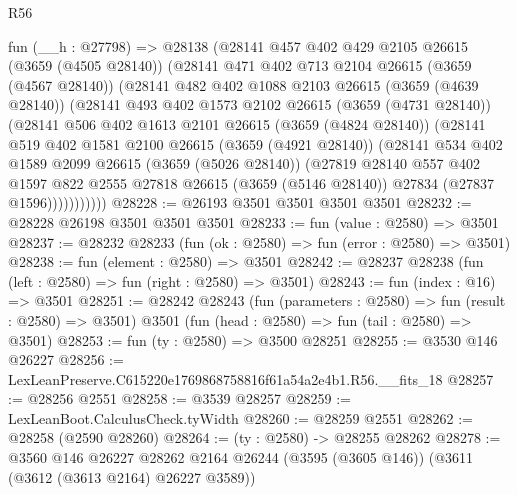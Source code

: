 \begin{lexlean}{R56}
\begin{coremodule}
      fun (__h : @27798) =>
      @28138
        (@28141
          @457
          @402
          @429
          @2105
          @26615
          (@3659 (@4505 @28140))
          (@28141
            @471
            @402
            @713
            @2104
            @26615
            (@3659 (@4567 @28140))
            (@28141
              @482
              @402
              @1088
              @2103
              @26615
              (@3659 (@4639 @28140))
              (@28141
                @493
                @402
                @1573
                @2102
                @26615
                (@3659 (@4731 @28140))
                (@28141
                  @506
                  @402
                  @1613
                  @2101
                  @26615
                  (@3659 (@4824 @28140))
                  (@28141
                    @519
                    @402
                    @1581
                    @2100
                    @26615
                    (@3659 (@4921 @28140))
                    (@28141
                      @534
                      @402
                      @1589
                      @2099
                      @26615
                      (@3659 (@5026 @28140))
                      (@27819
                        @28140
                        @557
                        @402
                        @1597
                        @822
                        @2555
                        @27818
                        @26615
                        (@3659 (@5146 @28140))
                        @27834
                        (@27837 @1596)))))))))))
@28228 := @26193 @3501 @3501 @3501 @3501
@28232 := @28228 @26198 @3501 @3501 @3501
@28233 := fun (value : @2580) => @3501
@28237 := @28232 @28233 (fun (ok : @2580) => fun (error : @2580) => @3501)
@28238 := fun (element : @2580) => @3501
@28242 := @28237 @28238 (fun (left : @2580) => fun (right : @2580) => @3501)
@28243 := fun (index : @16) => @3501
@28251 := @28242
    @28243
    (fun (parameters : @2580) => fun (result : @2580) => @3501)
    @3501
    (fun (head : @2580) => fun (tail : @2580) => @3501)
@28253 := fun (ty : @2580) => @3500 @28251
@28255 := @3530 @146 @26227
@28256 := LexLeanPreserve.C615220e1769868758816f61a54a2e4b1.R56.__fits_18
@28257 := @28256 @2551
@28258 := @3539 @28257
@28259 := LexLeanBoot.CalculusCheck.tyWidth
@28260 := @28259 @2551
@28262 := @28258 (@2590 @28260)
@28264 := (ty : @2580) -> @28255 @28262
@28278 := @3560
    @146
    @26227
    @28262
    @2164
    @26244
    (@3595 (@3605 @146))
    (@3611 (@3612 (@3613 @2164) @26227 @3589))

\end{coremodule}
\end{lexlean}
